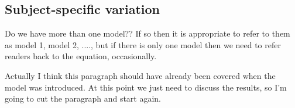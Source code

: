 \documentclass{article}
\newcommand{\green}[1]{{\color{green} #1}} %
\begin{document}



\subsection{Subject-specific variation}

\green{Do we have more than one model?? If so then it is appropriate to refer to them as model 1, model 2, ...., but if there is only one model then we need to refer readers back to the equation, occasionally.}

\green{Actually I think this paragraph should have already been covered when the model was introduced. At this point we just need to discuss the results, so I'm going to cut the paragraph and start again.}
\end{document}
